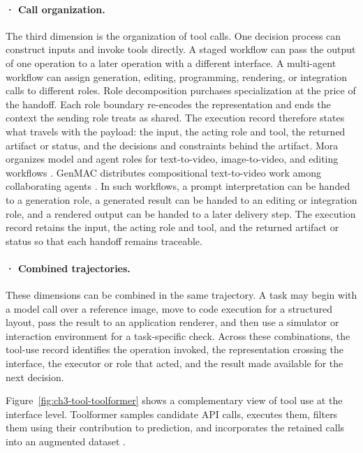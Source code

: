 \paragraph{· Call organization.} The third dimension is the organization of tool calls. One decision process can construct inputs and invoke tools directly. A staged workflow can pass the output of one operation to a later operation with a different interface. A multi-agent workflow can assign generation, editing, programming, rendering, or integration calls to different roles. Role decomposition purchases specialization at the price of the handoff. Each role boundary re-encodes the representation and ends the context the sending role treats as shared. The execution record therefore states what travels with the payload: the input, the acting role and tool, the returned artifact or status, and the decisions and constraints behind the artifact. Mora organizes model and agent roles for text-to-video, image-to-video, and editing workflows \cite{yuan2024mora}. GenMAC distributes compositional text-to-video work among collaborating agents \cite{huang2024genmac}. In such workflows, a prompt interpretation can be handed to a generation role, a generated result can be handed to an editing or integration role, and a rendered output can be handed to a later delivery step. The execution record retains the input, the acting role and tool, and the returned artifact or status so that each handoff remains traceable.

\paragraph{· Combined trajectories.} These dimensions can be combined in the same trajectory. A task may begin with a model call over a reference image, move to code execution for a structured layout, pass the result to an application renderer, and then use a simulator or interaction environment for a task-specific check. Across these combinations, the tool-use record identifies the operation invoked, the representation crossing the interface, the executor or role that acted, and the result made available for the next decision.

\noindent Figure~\ref{fig:ch3-tool-toolformer} shows a complementary view of tool use at the interface level. Toolformer samples candidate API calls, executes them, filters them using their contribution to prediction, and incorporates the retained calls into an augmented dataset \cite{schick2023toolformer}.

